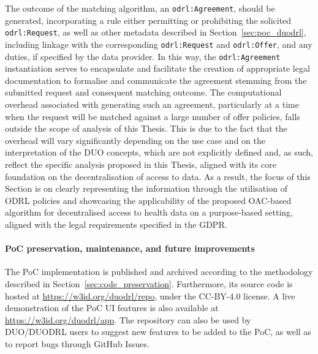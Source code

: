 The outcome of the matching algorithm, an \texttt{odrl:Agreement}, should be generated, incorporating a rule either permitting or prohibiting the solicited \texttt{odrl:Request}, as well as other metadata described in Section~\ref{sec:poc_duodrl}, including linkage with the corresponding \texttt{odrl:Request} and \texttt{odrl:Offer}, and any duties, if specified by the data provider.
In this way, the \texttt{odrl:Agreement} instantiation serves to encapsulate and facilitate the creation of appropriate legal documentation to formalise and communicate the agreement stemming from the submitted request and consequent matching outcome.
The computational overhead associated with generating such an agreement, particularly at a time when the request will be matched against a large number of offer policies, falls outside the scope of analysis of this Thesis.
This is due to the fact that the overhead will vary significantly depending on the use case and on the interpretation of the DUO concepts, which are not explicitly defined and, as such, reflect the specific analysis proposed in this Thesis, aligned with its core foundation on the decentralisation of access to data.
As a result, the focus of this Section is on clearly representing the information through the utilisation of ODRL policies and showcasing the applicability of the proposed OAC-based algorithm for decentralised access to health data on a purpose-based setting, aligned with the legal requirements specified in the GDPR.


\paragraph{PoC preservation, maintenance, and future improvements}
The PoC implementation is published and archived according to the methodology described in Section~\ref{sec:code_preservation}.
Furthermore, its source code is hosted at \url{https://w3id.org/duodrl/repo}, under the CC-BY-4.0 license.
A live demonstration of the PoC UI features is also available at \url{https://w3id.org/duodrl/app}.
The repository can also be used by DUO/DUODRL users to suggest new features to be added to the PoC, as well as to report bugs through GitHub Issues.
